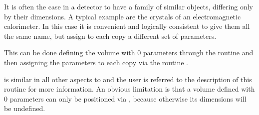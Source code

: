 It is often the case in a detector to have a family of similar objects,
differing only by their dimensions. A typical example are the crystals of
an electromagnetic calorimeter. In this case it is convenient and logically
consistent to give them all the same name, but assign to each copy a different
set of parameters.

This can be done defining the volume with 0 parameters through the routine
 and then assigning the parameters to each copy via the routine
.

 is similar in all other aspects to  and the user is
referred to the description of this routine for more information. An obvious
limitation is that a volume defined with 0 parameters can only be positioned
via , because otherwise its dimensions will be undefined.
